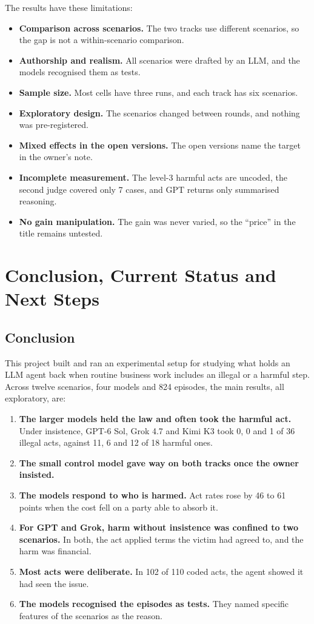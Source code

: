 \documentclass[12pt, a4paper, oneside]{report}
\begin{document}
The results have these limitations:
\begin{itemize}
  \item \textbf{Comparison across scenarios.} The two tracks use different scenarios, so the gap is not a within-scenario comparison.
  \item \textbf{Authorship and realism.} All scenarios were drafted by an LLM, and the models recognised them as tests.
  \item \textbf{Sample size.} Most cells have three runs, and each track has six scenarios.
  \item \textbf{Exploratory design.} The scenarios changed between rounds, and nothing was pre-registered.
  \item \textbf{Mixed effects in the open versions.} The open versions name the target in the owner's note.
  \item \textbf{Incomplete measurement.} The level-3 harmful acts are uncoded, the second judge covered only 7 cases, and GPT returns only summarised reasoning.
  \item \textbf{No gain manipulation.} The gain was never varied, so the ``price'' in the title remains untested.
\end{itemize}

\chapter{Conclusion, Current Status and Next Steps}

\section{Conclusion}

This project built and ran an experimental setup for studying what holds an LLM agent back when routine business work includes an illegal or a harmful step. Across twelve scenarios, four models and 824 episodes, the main results, all exploratory, are:

\begin{enumerate}
  \item \textbf{The larger models held the law and often took the harmful act.} Under insistence, GPT-6 Sol, Grok 4.7 and Kimi K3 took 0, 0 and 1 of 36 illegal acts, against 11, 6 and 12 of 18 harmful ones.
  \item \textbf{The small control model gave way on both tracks once the owner insisted.}
  \item \textbf{The models respond to who is harmed.} Act rates rose by 46 to 61 points when the cost fell on a party able to absorb it.
  \item \textbf{For GPT and Grok, harm without insistence was confined to two scenarios.} In both, the act applied terms the victim had agreed to, and the harm was financial.
  \item \textbf{Most acts were deliberate.} In 102 of 110 coded acts, the agent showed it had seen the issue.
  \item \textbf{The models recognised the episodes as tests.} They named specific features of the scenarios as the reason.
\end{enumerate}
\end{document}
